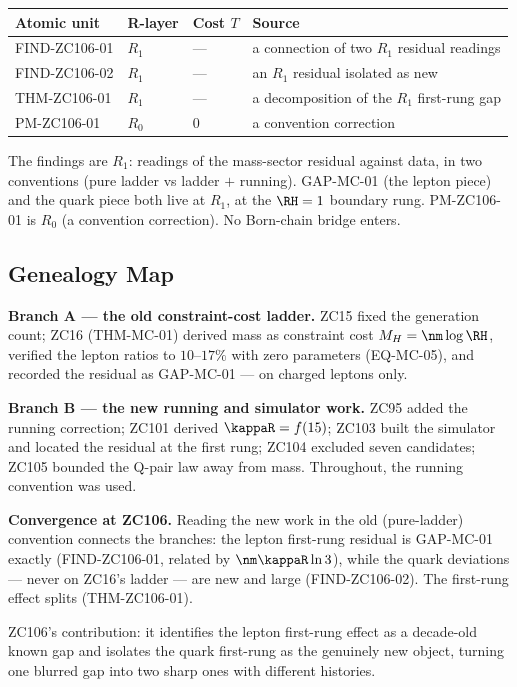 \documentclass[12pt, a4paper]{article}
\begin{document}
\begin{layerbox}[title={R-Layer Assignments for ZC106}]
{\small\renewcommand{\arraystretch}{1.25}
\begin{center}
\begin{tabular}{@{}llll@{}}
\toprule
Atomic unit & R-layer & Cost $T$ & Source \\
\midrule
FIND-ZC106-01 & $R_1$ & --- & a connection of two $R_1$ residual readings \\
FIND-ZC106-02 & $R_1$ & --- & an $R_1$ residual isolated as new \\
THM-ZC106-01  & $R_1$ & --- & a decomposition of the $R_1$ first-rung gap \\
PM-ZC106-01   & $R_0$ & $0$ & a convention correction \\
\bottomrule
\end{tabular}
\end{center}}
The findings are $R_1$: readings of the mass-sector residual against data, in two
conventions (pure ladder vs ladder $+$ running). GAP-MC-01 (the lepton piece) and
the quark piece both live at $R_1$, at the $\RH=1$ boundary rung. PM-ZC106-01 is
$R_0$ (a convention correction). No Born-chain bridge enters.
\end{layerbox}

\subsection{Genealogy Map}
\label{sec:genealogy-zc106}

\begin{genealogybox}[title={How ZC106 Connects the Old Mass Work to the New}]
\textbf{Branch A --- the old constraint-cost ladder.}
ZC15 fixed the generation count; ZC16 (THM-MC-01) derived mass as constraint cost
$M_H=\nm\log\RH$, verified the lepton ratios to $10$--$17\%$ with zero parameters
(EQ-MC-05), and recorded the residual as GAP-MC-01 --- on charged leptons only.

\textbf{Branch B --- the new running and simulator work.}
ZC95 added the running correction; ZC101 derived $\kappaR=f(15)$; ZC103 built the
simulator and located the residual at the first rung; ZC104 excluded seven
candidates; ZC105 bounded the Q-pair law away from mass. Throughout, the running
convention was used.

\textbf{Convergence at ZC106.}
Reading the new work in the old (pure-ladder) convention connects the branches:
the lepton first-rung residual is GAP-MC-01 exactly (FIND-ZC106-01, related by
$\nm\kappaR\ln3$), while the quark deviations --- never on ZC16's ladder --- are
new and large (FIND-ZC106-02). The first-rung effect splits (THM-ZC106-01).

ZC106's contribution: it identifies the lepton first-rung effect as a decade-old
known gap and isolates the quark first-rung as the genuinely new object, turning
one blurred gap into two sharp ones with different histories.
\end{genealogybox}
\end{document}
